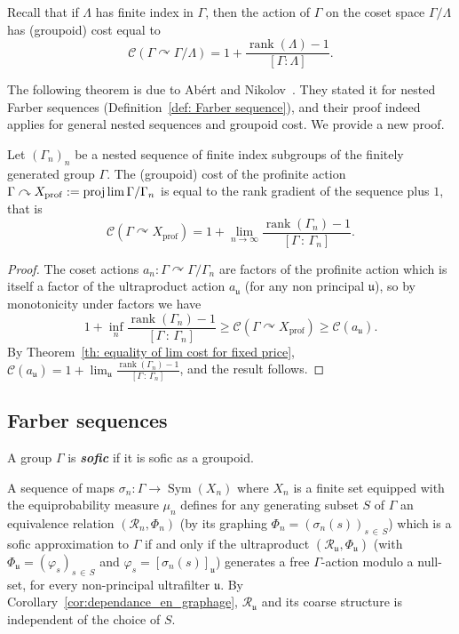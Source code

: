 \documentclass[AHL,Unicode,longabstracts,published]{cedram}
\newcommand{\defin}[1]{\textbf{\emph{#1}}}
\newcommand{\acting}{\curvearrowright}
\newcommand{\RR}{\mathcal{R}}
\newcommand{\cost}{\mathcal{C}}
\DeclareMathOperator{\Sym}{Sym}
\DeclareMathOperator{\rank}{rank}
\DeclareMathOperator{\prof}{prof}
\newcommand{\ul}{\mathfrak{u}}
\newcommand{\ph}{\varphi}
\begin{document}
Recall that if $\Lambda$ has finite index in $\Gamma$, then the action of $\Gamma$ on the coset space $\Gamma/\Lambda$ has (groupoid) cost equal to
\begin{equation}
\cost(\Gamma\acting \Gamma/\Lambda)=1+\frac{\rank(\Lambda)-1}{[\Gamma:\Lambda]}.
\end{equation}



The following theorem is due to Abért and Nikolov~\cite{Abert-Nikolov-12}. They stated it for nested Farber sequences (Definition~\ref{def: Farber sequence}), and their proof indeed applies for general nested sequences and groupoid cost. We provide a new proof.
\begin{coro}\label{cor: Abert-Nikolov}
Let $(\Gamma_n)_n$ be a nested sequence of finite index subgroups of the finitely generated group $\Gamma$. The (groupoid) cost of the profinite action $\Gamma\acting X_{\prof}:=\projlim \Gamma/\Gamma_n$ is equal to the rank gradient of the sequence plus $1$, that is
\[
\cost\left(\Gamma\acting X_{\prof}\right)=1+\lim\limits_{n\to \infty}\frac{\rank(\Gamma_n)-1}{[\Gamma\,:\,\Gamma_n]}.
\]
\end{coro}
\begin{proof}
The coset actions $a_n:\Gamma\acting \Gamma/\Gamma_n$ are factors of the profinite action which is itself a factor of the ultraproduct action $a_\ul$ (for any non principal $\ul$), so by monotonicity under factors we have
\[
1+\inf_n \frac{\rank(\Gamma_n)-1}{[\Gamma\,:\,\Gamma_n]}\geq
\cost\left(\Gamma\acting X_{\prof}\right)\geq \cost(a_{\ul}).
\]
By Theorem~\ref{th: equality of lim cost for fixed price}, $\cost(a_{\ul})=1+\lim_\ul\tfrac{\rank(\Gamma_n)-1}{[\Gamma\,:\,\Gamma_n]}$, and the result follows.
\end{proof}



\subsection{Farber sequences}\label{sect: Farber sequences}

A group $\Gamma$ is
\defin{sofic} if it is sofic as a groupoid.

\begin{rema}\label{rem:soficity and freeness of ultralimit action}
A sequence of maps $\sigma_n:\Gamma\to \Sym (X_n)$ where $X_n$ is a finite set equipped with the equiprobability measure $\mu_n$ defines for any generating subset $S$ of $\Gamma$ an equivalence relation $(\RR_n, \Phi_n)$ (by its graphing $\Phi_n=(\sigma_n(s))_{s\,\in\,S}$) which is a sofic approximation to $\Gamma$ if and only if the ultraproduct $(\RR_\ul, \Phi_\ul)$ (with $\Phi_\ul=(\ph_s)_{s\,\in\,S}$ and $\ph_s=[\sigma_n(s)]_\ul$) generates a free $\Gamma$-action modulo a null-set, for every non-principal ultrafilter $\ul$. By Corollary~\ref{cor:dependance_en_graphage}, $\RR_\ul$ and its coarse structure is independent of the choice of $S$.
\end{rema}
\end{document}
